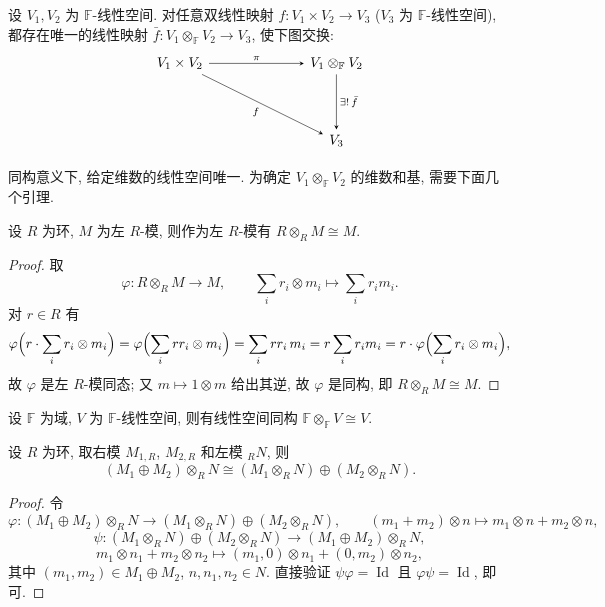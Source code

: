 \begin{theorem}[线性空间张量积的泛性质]\label{thm:tensor-universal-k}
设 $V_1,V_2$ 为 $\mathbb{F}$-线性空间.
对任意双线性映射 $f\colon V_1\times V_2\to V_3$ ($V_3$ 为 $\mathbb{F}$-线性空间),
都存在唯一的线性映射 $\bar f\colon V_1\otimes_{\mathbb{F}} V_2\to V_3$, 使下图交换:
\[
  \begin{tikzcd}[row sep=1.4cm, column sep=2.4cm, arrows={->,>=stealth}]
    V_1\times V_2 \arrow[r,"\pi"] \arrow[dr,"f"'] & V_1\otimes_{\mathbb{F}} V_2 \arrow[d,"\exists!\,\bar f"] \\
    & V_3
  \end{tikzcd}
\]
\end{theorem}

同构意义下, 给定维数的线性空间唯一. 为确定 $V_1\otimes_{\mathbb{F}} V_2$ 的维数和基, 需要下面几个引理.

\begin{lemma}\label{lem:tensor-with-R}
设 $R$ 为环, $M$ 为左 $R$-模, 则作为左 $R$-模有 $R\otimes_R M\cong M$.
\end{lemma}

\begin{proof}
取
\[
  \varphi\colon R\otimes_R M\longrightarrow M,\qquad \sum_i r_i\otimes m_i\longmapsto\sum_i r_i m_i .
\]
对 $r\in R$ 有
\[
  \varphi\Bigl(r\cdot\sum_i r_i\otimes m_i\Bigr)=\varphi\Bigl(\sum_i rr_i\otimes m_i\Bigr)
  =\sum_i rr_i\,m_i=r\sum_i r_i m_i=r\cdot\varphi\Bigl(\sum_i r_i\otimes m_i\Bigr),
\]
故 $\varphi$ 是左 $R$-模同态; 又 $m\longmapsto1\otimes m$ 给出其逆, 故 $\varphi$ 是同构, 即 $R\otimes_R M\cong M$.
\end{proof}

\begin{corollary}\label{cor:tensor-KV}
设 $\mathbb{F}$ 为域, $V$ 为 $\mathbb{F}$-线性空间, 则有线性空间同构 $\mathbb{F}\otimes_{\mathbb{F}} V\cong V$.
\end{corollary}

\begin{lemma}\label{lem:tensor-direct-sum}
设 $R$ 为环, 取右模 $M_{1,R}$, $M_{2,R}$ 和左模 ${}_R N$, 则
\[
  (M_1\oplus M_2)\otimes_R N\cong (M_1\otimes_R N)\oplus(M_2\otimes_R N).
\]
\end{lemma}

\begin{proof}
令
\[
  \varphi\colon (M_1\oplus M_2)\otimes_R N\longrightarrow (M_1\otimes_R N)\oplus(M_2\otimes_R N),
  \qquad (m_1+m_2)\otimes n\longmapsto m_1\otimes n+m_2\otimes n,
\]
\[
  \psi\colon (M_1\otimes_R N)\oplus(M_2\otimes_R N)\longrightarrow (M_1\oplus M_2)\otimes_R N,
\]
\[
  m_1\otimes n_1+m_2\otimes n_2\longmapsto (m_1,0)\otimes n_1+(0,m_2)\otimes n_2,
\]
其中 $(m_1,m_2)\in M_1\oplus M_2$, $n,n_1,n_2\in N$. 直接验证 $\psi\varphi=\operatorname{Id}$ 且
$\varphi\psi=\operatorname{Id}$, 即可.
\end{proof}

